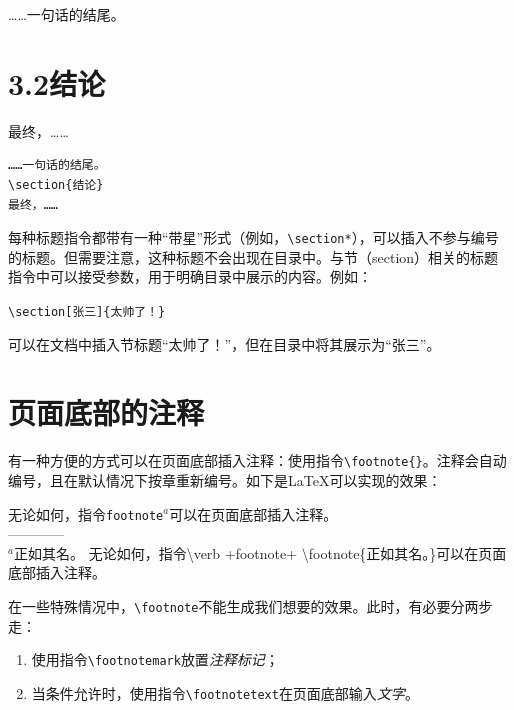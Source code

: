 \begin{codelist}[2.17]{
  ……一句话的结尾。
  \section*{3.2\quad 结论}
  最终，……
}\begin{verbatim}
……一句话的结尾。
\section{结论}
最终，……
\end{verbatim}
\end{codelist}

每种标题指令都带有一种“带星”形式（例如，\verb|\section*|），可以插入不参与编号的标题。但需要注意，这种标题不会出现在目录中。与节（section）相关的标题指令中可以接受参数，用于明确目录中展示的内容。例如：

\begin{dmd}
\verb+\section[张三]{太帅了！}+
\end{dmd}

可以在文档中插入节标题“太帅了！”，但在目录中将其展示为“张三”。

\section{页面底部的注释}

有一种方便的方式可以在页面底部插入注释：使用指令\verb|\footnote{|\verb|}|。注释会自动编号，且在默认情况下按章重新编号。如下是\LaTeX 可以实现的效果：

\begin{codelist}[2.18]{
  无论如何，指令\texttt{footnote}$^a$可以在页面底部插入注释。\\
  ————\\%
  {\footnotesize $^a$正如其名。}
}\ttfamily
无论如何，指令\backslash verb +footnote+
\backslash footnote\{正如其名。\}可以在页面
底部插入注释。\rmfamily
\end{codelist}

在一些特殊情况中，\verb|\footnote|不能生成我们想要的效果。此时，有必要分两步走：

\begin{enumerate}
  \item 使用指令\verb|\footnotemark|放置\emph{注释标记}；
  \item 当条件允许时，使用指令\verb|\footnotetext|在页面底部输入\emph{文字}。
\end{enumerate}

